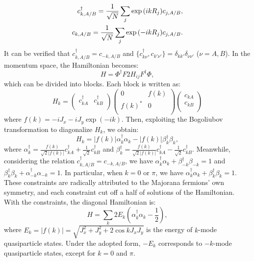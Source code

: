 \documentclass[twocolumn,floats,superscriptaddress]{revtex4}
\begin{document}
\begin{align}\label{ck}
 c_{k,A/B}^\dag=\frac{1}{\sqrt {N}}\sum_j{\exp{(ikR_j)}c_{j,A/B}} ,\notag \\
 c_{k,A/B}=\frac{1}{\sqrt {N}}\sum_j{\exp{(-ikR_j)}c_{j,A/B}} .
\end{align}
It can be verified that $c_{k,A/B}^\dag= c_{-k,A/B}$ and $\{c_{k\nu}^\dag,c_{k'\nu'}\}=\delta_{kk'}\delta_{\nu\nu'}$ ($\nu=A,B$). In the momentum space, the Hamiltonian becomes:
\begin{equation}\label{hk}
 H= \Phi^\dag F2H_{ij}F^\dag\Phi,
\end{equation}
which can be divided into blocks. Each block is written as:
\begin{equation}\label{hkb}
H_k=\left(
  \begin{array}{cc}
  c_{kA}^\dag & c_{kB}^\dag \\
  \end{array}
 \right)
 \left(
  \begin{array}{cc}
  0 & f(k) \\
  f(k)^\ast & 0 \\
  \end{array}
 \right)
 \left(
  \begin{array}{c}
  c_{k A } \\
  c_{kB} \\
  \end{array}
 \right)
\end{equation}
where $f(k)=-iJ_x-iJ_y\exp{(-ik)}$.
Then, exploiting the Bogoliubov transformation to diagonalize $H_k$, we obtain:
\begin{equation}\label{hkd}
H_k=|f(k)|\alpha_{k}^\dag \alpha_{k}-|f(k)|\beta_{k}^{\dag}\beta_{k},
\end{equation}
where $\alpha_{k}^\dag=\frac{f(k)}{\sqrt2|f(k)|}c_{kA}^\dag+\frac{1}{\sqrt2}c_{kB}^\dag$ and $\beta_{k}^\dag=\frac{f(k)}{\sqrt2|f(k)|}c_{kA}^\dag-\frac{1}{\sqrt2}c_{kB}^\dag$. Meanwhile, considering the relation $c_{k,A/B}^\dag= c_{-k,A/B}$, we have $\alpha_{k}^\dag \alpha_{k}+\beta_{-k}^\dag \beta_{-k}=1$ and $\beta_{k}^\dag \beta_{k}+\alpha_{-k}^\dag \alpha_{-k}=1$. {In particular}, when $k=0$ or $\pi$, we have $\alpha_{k}^\dag \alpha_{k}+\beta_{k}^\dag \beta_{k}=1$. These constraints are radically attributed to the Majorana fermions' own symmetry, and {each} constraint cut off a half {of} solutions of the Hamiltonian. With the constraints, the diagonal Hamiltonian is:
\begin{equation}\label{hkd1}
H=\sum_{k}2E_k(\alpha_{k}^\dag \alpha_{k}-\frac{1}{2}),
\end{equation}
where $E_k=|f(k)|=\sqrt{J_x^2+J_y^2+2\cos{k}J_xJ_y}$ is the energy of $k$-mode quasiparticle states. Under the adopted form, $-E_k$ corresponds to $-k$-mode quasiparticle states, except for $k=0$ and $\pi$.
\end{document}

